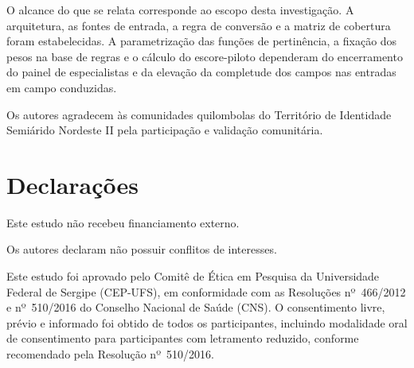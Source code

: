 \documentclass[pdflatex,sn-basic]{sn-jnl}%
\theoremstyle{thmstyleone}%
\theoremstyle{thmstyletwo}%
\theoremstyle{thmstylethree}%
\begin{document}
O alcance do que se relata corresponde ao escopo desta investigação. A arquitetura, as fontes de entrada, a regra de conversão e a matriz de cobertura foram estabelecidas. A parametrização das funções de pertinência, a fixação dos pesos na base de regras e o cálculo do escore-piloto dependeram do encerramento do painel de especialistas e da elevação da completude dos campos nas entradas em campo conduzidas.


\backmatter


Os autores agradecem às comunidades quilombolas do Território de Identidade Semiárido Nordeste II pela participação e validação comunitária.

\section*{Declarações}

Este estudo não recebeu financiamento externo.

Os autores declaram não possuir conflitos de interesses.



Este estudo foi aprovado pelo Comitê de Ética em Pesquisa da Universidade Federal de Sergipe (CEP-UFS), em conformidade com as Resoluções nº~466/2012 e nº~510/2016 do Conselho Nacional de Saúde (CNS). O consentimento livre, prévio e informado foi obtido de todos os participantes, incluindo modalidade oral de consentimento para participantes com letramento reduzido, conforme recomendado pela Resolução nº~510/2016.

\end{document}

